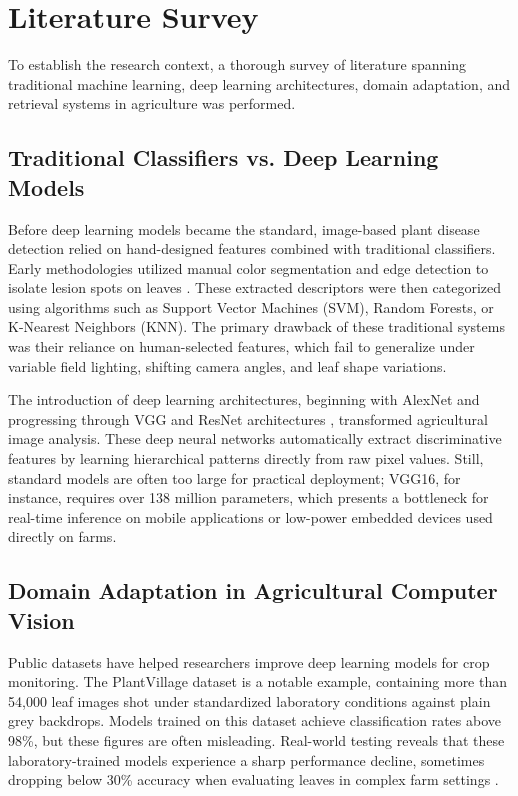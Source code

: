 \documentclass[12pt, a4paper]{report}
\begin{document}
\section{Literature Survey}
To establish the research context, a thorough survey of literature spanning traditional machine learning, deep learning architectures, domain adaptation, and retrieval systems in agriculture was performed.

\subsection{Traditional Classifiers vs. Deep Learning Models}
Before deep learning models became the standard, image-based plant disease detection relied on hand-designed features combined with traditional classifiers. Early methodologies utilized manual color segmentation and edge detection to isolate lesion spots on leaves \cite{alhiary2011}. These extracted descriptors were then categorized using algorithms such as Support Vector Machines (SVM), Random Forests, or K-Nearest Neighbors (KNN). The primary drawback of these traditional systems was their reliance on human-selected features, which fail to generalize under variable field lighting, shifting camera angles, and leaf shape variations.

The introduction of deep learning architectures, beginning with AlexNet and progressing through VGG and ResNet architectures \cite{vgg}, transformed agricultural image analysis. These deep neural networks automatically extract discriminative features by learning hierarchical patterns directly from raw pixel values. Still, standard models are often too large for practical deployment; VGG16, for instance, requires over 138 million parameters, which presents a bottleneck for real-time inference on mobile applications or low-power embedded devices used directly on farms.

\subsection{Domain Adaptation in Agricultural Computer Vision}
Public datasets have helped researchers improve deep learning models for crop monitoring. The PlantVillage dataset \cite{plantvillage} is a notable example, containing more than 54,000 leaf images shot under standardized laboratory conditions against plain grey backdrops. Models trained on this dataset achieve classification rates above 98\%, but these figures are often misleading. Real-world testing reveals that these laboratory-trained models experience a sharp performance decline, sometimes dropping below 30\% accuracy when evaluating leaves in complex farm settings \cite{mohanty}.
\end{document}
